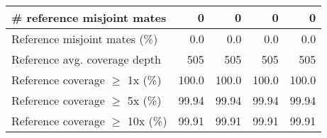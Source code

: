 \documentclass[12pt,a4paper]{article}
\begin{document}
\begin{table}[ht]
\begin{center}
\begin{tabular}{|l*{4}{|r}|}
\# reference misjoint mates & 0 & 0 & 0 & 0 \\ \hline
Reference misjoint mates (\%) & 0.0 & 0.0 & 0.0 & 0.0 \\ \hline
Reference avg. coverage depth & 505 & 505 & 505 & 505 \\ \hline
Reference coverage $\geq$ 1x (\%) & 100.0 & 100.0 & 100.0 & 100.0 \\ \hline
Reference coverage $\geq$ 5x (\%) & 99.94 & 99.94 & 99.94 & 99.94 \\ \hline
Reference coverage $\geq$ 10x (\%) & 99.91 & 99.91 & 99.91 & 99.91 \\ \hline
\end{tabular}
\end{center}
\end{table}
\end{document}

